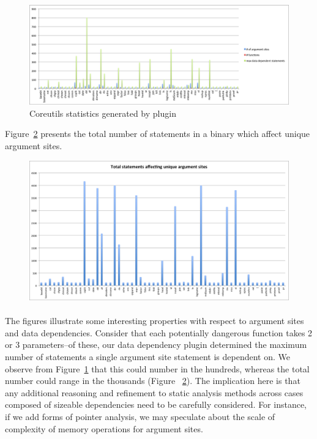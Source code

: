 \documentclass[letterpaper,11pt]{article}
\begin{document}
\begin{figure}[ht!]
\centering
\includegraphics[scale=0.55, trim=0mm 0mm 0mm 0mm, clip]{img/coreutils2.pdf}
\caption{Coreutils statistics generated by plugin}
\label{fig:corestats}
\end{figure}

Figure~\ref{fig:coretotal} presents the total number of statements in a binary
which affect unique argument sites.

\begin{figure}[ht!]
\centering
\includegraphics[scale=0.45, trim=0mm 0mm 0mm 0mm, clip]{img/coreutilstotal.pdf}
\label{fig:coretotal}
\end{figure}

\paragraph{}
The figures illustrate some interesting properties with respect to argument
sites and data dependencies. Consider that each potentially dangerous function
takes 2 or 3 parameters--of these, our data dependency plugin determined the
maximum number of statements a single argument site statement is dependent on.
We observe from Figure~\ref{fig:corestats} that this could number in the hundreds,
whereas the total number could range in the thousands (Figure ~\ref{fig:coretotal}).
The implication here is that any additional reasoning and refinement to static
analysis methods across cases composed of sizeable dependencies need to be
carefully considered. For instance, if we add forms of pointer analysis,
we may speculate about the scale of complexity of memory operations for
argument sites.
\end{document}
